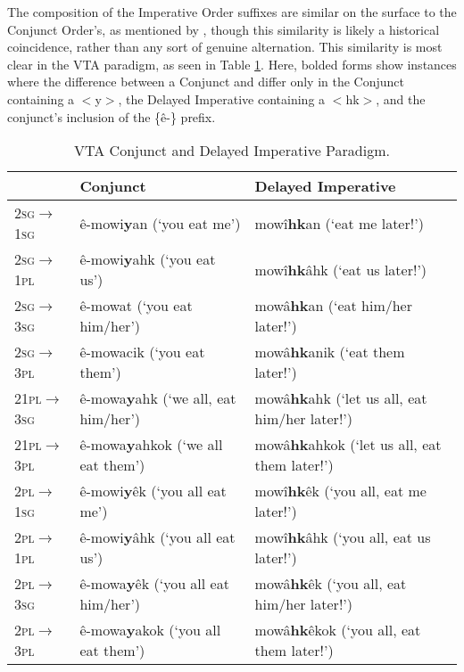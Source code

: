 The composition of the Imperative Order suffixes are similar on the surface to the Conjunct Order's, as mentioned by \citet{Wolfart1973}, though this similarity is likely a historical coincidence, rather than any sort of genuine alternation. This similarity is most clear in the VTA paradigm, as seen in Table \ref{tab:vtaimp}. Here, bolded forms show instances where the difference between a Conjunct and differ only in the Conjunct containing a $<$y$>$, the Delayed Imperative containing a $<$hk$>$, and the conjunct's inclusion of the \{ê-\} prefix.



\begin{table}
  \centering
  \footnotesize
  \begin{tabular}{lll}
    \toprule
     & Conjunct & Delayed Imperative           \\
    \midrule
2\textsc{sg}$\rightarrow$1\textsc{sg} & ê-mowi\textbf{y}an (`you eat me') & mowî\textbf{hk}an (`eat me later!')\\
2\textsc{sg}$\rightarrow$1\textsc{pl} & ê-mowi\textbf{y}ahk (`you eat us')  & mowî\textbf{hk}âhk (`eat us later!') \\
2\textsc{sg}$\rightarrow$3\textsc{sg} & ê-mowat (`you eat him/her') & mowâ\textbf{hk}an (`eat him/her later!') \\
2\textsc{sg}$\rightarrow$3\textsc{pl} & ê-mowacik (`you eat them') & mowâ\textbf{hk}anik (`eat them later!') \\
21\textsc{pl}$\rightarrow$3\textsc{sg} & ê-mowa\textbf{y}ahk (`we all, eat him/her') & mowâ\textbf{hk}ahk (`let us all, eat him/her later!')\\
21\textsc{pl}$\rightarrow$3\textsc{pl} & ê-mowa\textbf{y}ahkok (`we all eat them') & mowâ\textbf{hk}ahkok (`let us all, eat them later!') \\
2\textsc{pl}$\rightarrow$1\textsc{sg}  & ê-mowi\textbf{y}êk (`you all eat me') & mowî\textbf{hk}êk (`you all, eat me later!') \\
2\textsc{pl}$\rightarrow$1\textsc{pl}  & ê-mowi\textbf{y}âhk (`you all eat us')& mowî\textbf{hk}âhk (`you all, eat us later!')\\
2\textsc{pl}$\rightarrow$3\textsc{sg}  & ê-mowa\textbf{y}êk (`you all eat him/her') & mowâ\textbf{hk}êk (`you all, eat him/her later!') \\
2\textsc{pl}$\rightarrow$3\textsc{pl}  & ê-mowa\textbf{y}akok (`you all eat them') & mowâ\textbf{hk}êkok (`you all, eat them later!') \\
    \bottomrule
  \end{tabular}
  \caption{
    VTA Conjunct and Delayed Imperative Paradigm.\label{tab:vtaimp}
  }
\end{table}



